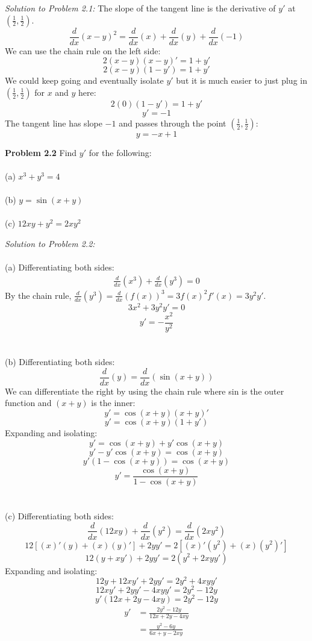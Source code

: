 \documentclass[11pt]{scrartcl}
\begin{document}
\noindent
\textit{Solution to Problem 2.1:} The slope of the tangent line is the derivative of $y'$ at  $\left(\frac{1}{2}, \frac{1}{2}\right)$. 
$$\frac{d}{dx}(x-y)^2=\frac{d}{dx}(x)+\frac{d}{dx}(y)+\frac{d}{dx}(-1)$$
We can use the chain rule on the left side:
$$2(x-y)(x-y)'=1+y'$$
$$2(x-y)(1-y')=1+y'$$
We could keep going and eventually isolate $y'$ but it is much easier to just plug in $\left(\frac{1}{2}, \frac{1}{2}\right)$ for $x$ and $y$ here:
$$2(0)(1-y')=1+y'$$
$$y'=-1$$
The tangent line has slope $-1$ and passes through the point $\left(\frac{1}{2}, \frac{1}{2}\right)$:
$$y=-x+1$$
\begin{tcolorbox}
[colback=purple!5!white,colframe=purple!75!black]
\textbf{Problem 2.2} Find $y'$ for the following:\\
\noindent\\
(a) \;\;\;\;$x^3+y^3=4$\\
\noindent\\
(b) \;\;\;\;$y=\sin (x+y)$\\
\noindent\\
(c) \;\;\;\;$12xy+y^2=2xy^2$
\end{tcolorbox}
\noindent
\textit{Solution to Problem 2.2:}\\
\noindent\\
(a) Differentiating both sides:
\begin{align*}
    \frac{d}{dx}(x^3)+\frac{d}{dx}(y^3)=0
\end{align*}
By the chain rule, $\frac{d}{dx}(y^3)=\frac{d}{dx}(f(x))^3=3f(x)^2f'(x)=3y^2y'$.
$$3x^2+3y^2y'=0$$
$$y'=-\frac{x^2}{y^2}$$\\
\noindent\\
(b) Differentiating both sides:
$$\frac{d}{dx}(y)=\frac{d}{dx}(\sin (x+y))$$
We can differentiate the right by using the chain rule where sin is the outer function and $(x+y)$ is the inner:
$$y'=\cos (x+y)(x+y)'$$
$$y'=\cos(x+y)(1+y')$$
Expanding and isolating:
$$y'=\cos (x+y)+y'\cos (x+y)$$
$$y'-y'\cos (x+y)=\cos (x+y)$$
$$y'(1-\cos (x+y))=\cos (x+y)$$
$$y'=\frac{\cos (x+y)}{1-\cos (x+y)}$$\\
\noindent\\
(c) Differentiating both sides:
$$\frac{d}{dx}(12xy)+\frac{d}{dx}(y^2)=\frac{d}{dx}(2xy^2)$$
$$12[(x)'(y)+(x)(y)']+2yy'=2[(x)'(y^2)+(x)(y^2)']$$
$$12(y+xy')+2yy'=2(y^2+2xyy')$$
Expanding and isolating:
$$12y+12xy'+2yy'=2y^2+4xyy'$$
$$12xy'+2yy'-4xyy'=2y^2-12y$$
$$y'(12x+2y-4xy)=2y^2-12y$$
\begin{align*}
    y' & = \frac{2y^2-12y}{12x+2y-4xy}\\
       & = \frac{y^2-6y}{6x+y-2xy}
\end{align*}
\end{document}
